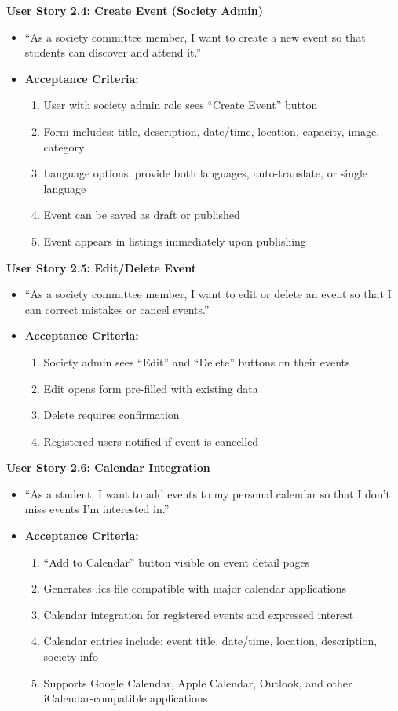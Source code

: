 \documentclass[12pt,a4paper]{article}
\begin{document}
\textbf{User Story 2.4: Create Event (Society Admin)}
\begin{itemize}
    \item ``As a society committee member, I want to create a new event so that students can discover and attend it.''
    \item \textbf{Acceptance Criteria:}
    \begin{enumerate}
        \item User with society admin role sees ``Create Event'' button
        \item Form includes: title, description, date/time, location, capacity, image, category
        \item Language options: provide both languages, auto-translate, or single language
        \item Event can be saved as draft or published
        \item Event appears in listings immediately upon publishing
    \end{enumerate}
\end{itemize}

\textbf{User Story 2.5: Edit/Delete Event}
\begin{itemize}
    \item ``As a society committee member, I want to edit or delete an event so that I can correct mistakes or cancel events.''
    \item \textbf{Acceptance Criteria:}
    \begin{enumerate}
        \item Society admin sees ``Edit'' and ``Delete'' buttons on their events
        \item Edit opens form pre-filled with existing data
        \item Delete requires confirmation
        \item Registered users notified if event is cancelled
    \end{enumerate}
\end{itemize}

\textbf{User Story 2.6: Calendar Integration}
\begin{itemize}
    \item ``As a student, I want to add events to my personal calendar so that I don't miss events I'm interested in.''
    \item \textbf{Acceptance Criteria:}
    \begin{enumerate}
        \item ``Add to Calendar'' button visible on event detail pages
        \item Generates .ics file compatible with major calendar applications
        \item Calendar integration for registered events and expressed interest
        \item Calendar entries include: event title, date/time, location, description, society info
        \item Supports Google Calendar, Apple Calendar, Outlook, and other iCalendar-compatible applications
    \end{enumerate}
\end{itemize}
\end{document}
